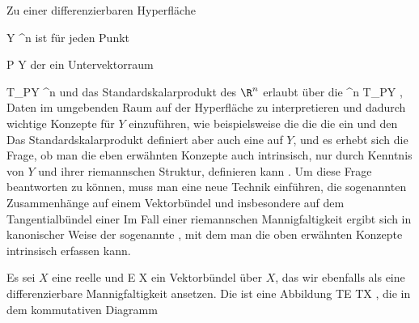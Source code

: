\setcounter{section}{24}

Zu einer differenzierbaren Hyperfläche

\mavergleichskette
{\vergleichskette
{ Y
}
{ \subseteq }{ \R^n
}
{  }{
}
{    }{
}
{   }{
}
}
{}{}{}
ist für jeden Punkt

\mavergleichskette
{\vergleichskette
{ P
}
{ \in }{ Y
}
{  }{
}
{    }{
}
{   }{
}
}
{}{}{}
der
ein Untervektorraum

\mavergleichskette
{\vergleichskette
{ T_PY
}
{ \subseteq }{ \R^n
}
{  }{
}
{    }{
}
{   }{
}
}
{}{}{}
und das Standardskalarprodukt des $\R^n$ erlaubt über die
 {\R^n } { T_PY
} {,}
Daten im umgebenden Raum auf der Hyperfläche zu interpretieren und dadurch wichtige Konzepte für $Y$ einzuführen, wie beispielsweise die
die
die
ein
und den
Das Standardskalarprodukt definiert aber auch eine
auf $Y$, und es erhebt sich die Frage, ob man die eben erwähnten Konzepte auch intrinsisch, nur durch Kenntnis von $Y$ und ihrer riemannschen Struktur, definieren kann
 {} {.}
Um diese Frage beantworten zu können, muss man eine neue Technik einführen, die sogenannten Zusammenhänge auf einem Vektorbündel und insbesondere auf dem Tangentialbündel einer
Im Fall einer riemannschen Mannigfaltigkeit ergibt sich in kanonischer Weise der sogenannte  {}
 {} {,}
mit dem man die oben erwähnten Konzepte intrinsisch erfassen kann.


Es sei $X$ eine reelle
und
 { E } { X
} {}
ein Vektorbündel über $X$, das wir ebenfalls als eine differenzierbare Mannigfaltigkeit ansetzen. Die
ist eine Abbildung
 {TE} {TX
} {,}
die in dem kommutativen Diagramm

